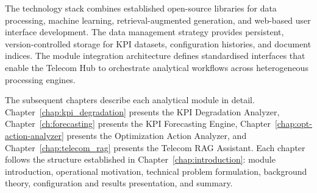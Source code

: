 The technology stack combines established open-source libraries for data processing, machine learning, retrieval-augmented generation, and web-based user interface development. The data management strategy provides persistent, version-controlled storage for KPI datasets, configuration histories, and document indices. The module integration architecture defines standardised interfaces that enable the Telecom Hub to orchestrate analytical workflows across heterogeneous processing engines.

The subsequent chapters describe each analytical module in detail. Chapter~\ref{chap:kpi_degradation} presents the KPI Degradation Analyzer, Chapter~\ref{ch:forecasting} presents the KPI Forecasting Engine, Chapter~\ref{chap:opt-action-analyzer} presents the Optimization Action Analyzer, and Chapter~\ref{chap:telecom_rag} presents the Telecom RAG Assistant. Each chapter follows the structure established in Chapter~\ref{chap:introduction}: module introduction, operational motivation, technical problem formulation, background theory, configuration and results presentation, and summary.
